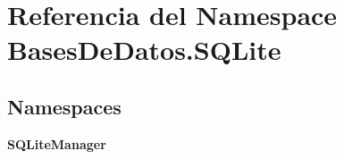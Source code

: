 \section{Referencia del Namespace Bases\-De\-Datos.\-S\-Q\-Lite}
\label{namespaceBasesDeDatos_1_1SQLite}
\subsection*{Namespaces}
\begin{DoxyCompactItemize}
\item 
{\bf S\-Q\-Lite\-Manager}
\end{DoxyCompactItemize}
